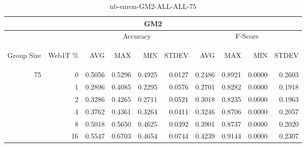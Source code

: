 \begin{center}
\begin{table}[htbp]
\begin{tabular}{ | r | r | r | r | r | r | r | r | r | r |}
\hline
\multicolumn{10}{|c|}{GM2}\\
\hline
 & & \multicolumn{4}{|c|}{Accuracy} & \multicolumn{4}{|c|}{F-Score}\\ \cline{3-10}
\begin{sideways}Group Size\end{sideways} & \begin{sideways}Web1T \%\end{sideways} & \begin{sideways}AVG\end{sideways} & \begin{sideways}MAX\end{sideways} & \begin{sideways}MIN\end{sideways} & \begin{sideways}STDEV\end{sideways} & \begin{sideways}AVG\end{sideways} & \begin{sideways}MAX\end{sideways} & \begin{sideways}MIN\end{sideways} & \begin{sideways}STDEV\end{sideways}\\
\hline
\multirow{5}{*}{75}
 & 0 & 0.5056 & 0.5296 & 0.4925 & 0.0127 & 0.2486 & 0.8921 & 0.0000 & 0.2603\\ \cline{2-10}
 & 1 & 0.2896 & 0.4085 & 0.2295 & 0.0576 & 0.2701 & 0.8282 & 0.0000 & 0.1918\\ \cline{2-10}
 & 2 & 0.3286 & 0.4265 & 0.2711 & 0.0521 & 0.3018 & 0.8235 & 0.0000 & 0.1963\\ \cline{2-10}
 & 4 & 0.3762 & 0.4361 & 0.3264 & 0.0411 & 0.3246 & 0.8706 & 0.0000 & 0.2057\\ \cline{2-10}
 & 8 & 0.5018 & 0.5650 & 0.4625 & 0.0392 & 0.3901 & 0.8737 & 0.0000 & 0.2020\\ \cline{2-10}
 & 16 & 0.5547 & 0.6703 & 0.4654 & 0.0744 & 0.4239 & 0.9144 & 0.0000 & 0.2307\\ \cline{2-10}
\hline
\end{tabular}
\caption{nb-enron-GM2-ALL-ALL-75}
\label{table:nb-enron-GM2-ALL-ALL-75}
\end{table}
\end{center}

